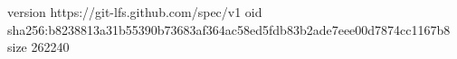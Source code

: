 version https://git-lfs.github.com/spec/v1
oid sha256:b8238813a31b55390b73683af364ac58ed5fdb83b2ade7eee00d7874cc1167b8
size 262240
